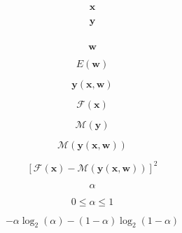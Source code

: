 \documentclass[10pt,twoside]{book}
\newcommand{\fat}[1]{\mathbf{#1}} %
\begin{document}
$$
\fat{x}
$$

$$
\fat{y}
$$

$$
$$

$$
\fat{w}
$$

$$
E(\fat{w})
$$

$$
\fat{y}( \fat{x}, \fat{w} )
$$

$$
\mathcal{F}( \fat{x} )
$$

$$
\mathcal{M}( \fat{y} )
$$

$$
\mathcal{M}( \fat{y}( \fat{x}, \fat{w} ) )
$$


$$
\left[ 
\mathcal{F}( \fat{x} ) - \mathcal{M}( \fat{y}( \fat{x}, \fat{w} ) )
\right]^2
$$



$$
\alpha
$$

$$
0 \leq
\alpha
\leq 1
$$

$$
-\alpha \log_2( \alpha ) - (1-\alpha) \log_2( 1-\alpha )
$$
\end{document}
